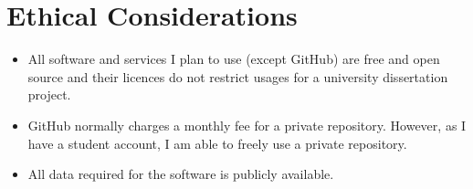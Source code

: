 \documentclass{article}
\begin{document}
	\section{Ethical Considerations}
	\begin{itemize}
		\item All software and services I plan to use (except GitHub) are free and open source and their licences do not restrict usages for a university dissertation project.
		\item GitHub normally charges a monthly fee for a private repository. However, as I have a student account, I am able to freely use a private repository.
		\item All data required for the software is publicly available.
	\end{itemize}

	
	
\end{document}
